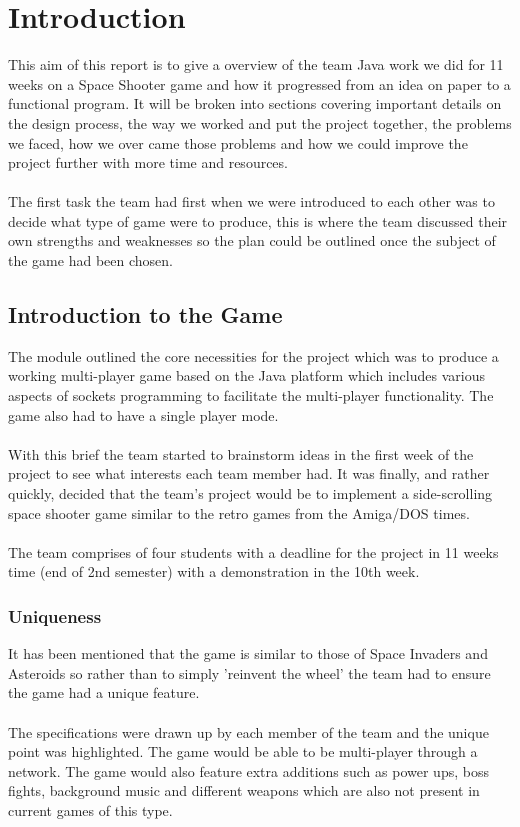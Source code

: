 
\chapter{Introduction}
\label{cha:introduction}

This aim of this report is to give a overview of the team Java work we did for 11 weeks on a Space Shooter game and how it progressed from an idea on paper to a functional program.
It will be broken into sections covering important details on the design process, the way we worked and put the project together, the problems we faced, how we over came those problems and how we could improve the project further with more time and resources.\\\\
The first task the team had first when we were introduced to each other was to decide what type of game were to produce, this is where the team discussed their own strengths and weaknesses so the plan could be outlined once the subject of the game had been chosen.

\section{Introduction to the Game}
\label{sec: intro_to_game}
The module outlined the core necessities for the project which was to produce a working multi-player game based on the Java platform which includes various aspects of sockets programming to facilitate the multi-player functionality. The game also had to have a single player mode.\\\\
With this brief the team started to brainstorm ideas in the first week of the project to see what interests each team member had. It was finally, and rather quickly, decided that the team's project would be to implement a side-scrolling space shooter game similar to the retro games from the Amiga/DOS times.\\\\
The team comprises of four students with a deadline for the project in 11 weeks time (end of 2nd semester) with a demonstration in the 10th week.
\subsection{Uniqueness}It has been mentioned that the game is similar to those of Space Invaders and Asteroids so rather than to simply 'reinvent the wheel' the team had to ensure the game had a unique feature.\\\\
The specifications were drawn up by each member of the team and the unique point was highlighted. The game would be able to be multi-player through a network. The game would also feature extra additions such as power ups, boss fights, background music and different weapons which are also not present in current games of this type.
